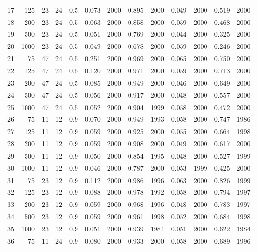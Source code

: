 \documentclass{article}
\begin{document}
\begin{table}[ht]
\begin{center}
\begin{tabular}{rrrrrrrrrrrrr}
  17 & 125 & 23 & 24 & 0.5 & 0.073 & 2000 & 0.895 & 2000 & 0.049 & 2000 & 0.519 & 2000 \\ 
  18 & 200 & 23 & 24 & 0.5 & 0.063 & 2000 & 0.858 & 2000 & 0.059 & 2000 & 0.468 & 2000 \\ 
  19 & 500 & 23 & 24 & 0.5 & 0.051 & 2000 & 0.769 & 2000 & 0.044 & 2000 & 0.325 & 2000 \\ 
  20 & 1000 & 23 & 24 & 0.5 & 0.049 & 2000 & 0.678 & 2000 & 0.059 & 2000 & 0.246 & 2000 \\ 
   \hline
21 & 75 & 47 & 24 & 0.5 & 0.251 & 2000 & 0.969 & 2000 & 0.065 & 2000 & 0.750 & 2000 \\ 
  22 & 125 & 47 & 24 & 0.5 & 0.120 & 2000 & 0.971 & 2000 & 0.059 & 2000 & 0.713 & 2000 \\ 
  23 & 200 & 47 & 24 & 0.5 & 0.085 & 2000 & 0.949 & 2000 & 0.046 & 2000 & 0.649 & 2000 \\ 
  24 & 500 & 47 & 24 & 0.5 & 0.056 & 2000 & 0.917 & 2000 & 0.048 & 2000 & 0.557 & 2000 \\ 
  25 & 1000 & 47 & 24 & 0.5 & 0.052 & 2000 & 0.904 & 1999 & 0.058 & 2000 & 0.472 & 2000 \\ 
   \hline
26 & 75 & 11 & 12 & 0.9 & 0.070 & 2000 & 0.949 & 1993 & 0.058 & 2000 & 0.747 & 1986 \\ 
  27 & 125 & 11 & 12 & 0.9 & 0.059 & 2000 & 0.925 & 2000 & 0.055 & 2000 & 0.664 & 1998 \\ 
  28 & 200 & 11 & 12 & 0.9 & 0.059 & 2000 & 0.908 & 2000 & 0.049 & 2000 & 0.617 & 2000 \\ 
  29 & 500 & 11 & 12 & 0.9 & 0.050 & 2000 & 0.854 & 1995 & 0.048 & 2000 & 0.527 & 1999 \\ 
  30 & 1000 & 11 & 12 & 0.9 & 0.046 & 2000 & 0.787 & 2000 & 0.053 & 1999 & 0.425 & 2000 \\ 
   \hline
31 & 75 & 23 & 12 & 0.9 & 0.112 & 2000 & 0.986 & 1996 & 0.063 & 2000 & 0.826 & 1999 \\ 
  32 & 125 & 23 & 12 & 0.9 & 0.088 & 2000 & 0.978 & 1992 & 0.058 & 2000 & 0.794 & 1997 \\ 
  33 & 200 & 23 & 12 & 0.9 & 0.059 & 2000 & 0.968 & 1996 & 0.048 & 2000 & 0.783 & 1997 \\ 
  34 & 500 & 23 & 12 & 0.9 & 0.059 & 2000 & 0.961 & 1998 & 0.052 & 2000 & 0.684 & 1998 \\ 
  35 & 1000 & 23 & 12 & 0.9 & 0.051 & 2000 & 0.939 & 1984 & 0.051 & 2000 & 0.622 & 1984 \\ 
   \hline
36 & 75 & 11 & 24 & 0.9 & 0.080 & 2000 & 0.933 & 2000 & 0.058 & 2000 & 0.689 & 1996 \\ 

\end{tabular}
\end{center}
\end{table}
\end{document}
